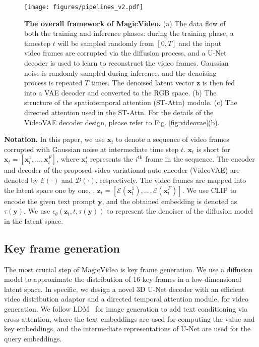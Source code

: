 \documentclass[10pt,twocolumn,letterpaper]{article}
\def\vx{{\bm{x}}}
\def\vy{{\bm{y}}}
\def\vz{{\bm{z}}}
\newcommand{\myPara}[1]{\vspace{6pt}\noindent\textbf{#1}}
\begin{document}
\begin{figure*}[t] 
\centering
\texttt{[image: figures/pipelines\_v2.pdf]}
\caption{\textbf{The overall framework of MagicVideo.} (a) The data flow of both the training and inference phases: during the training phase, a timestep $t$ will be sampled randomly from $[0, T]$ and the input video frames are corrupted via the diffusion process, and a U-Net decoder is used to learn to reconstruct the video frames. Gaussian noise is randomly sampled during inference, and the denoising process is repeated $T$ times. The denoised latent vector $\vz$ is then fed into a VAE decoder and converted to the RGB space. (b) The structure of the spatiotemporal attention (ST-Attn) module. (c) The directed attention used in the ST-Attn. For the details of the VideoVAE decoder design, please refer to Fig. \ref{fig:videovae}(b).}
\vspace{-3mm}
\label{fig:pipeline}
\end{figure*}



\myPara{Notation.} In this paper, we use $\vx_t$ to denote a sequence of video frames corrupted with Gaussian noise at intermediate time step $t$. $\vx_t$ is short for $\vx_t = [\vx_t^1, ..., \vx_t^F]$, where $\vx_t^i$ represents the $i^{\text{th}}$ frame in the sequence. The encoder and decoder of the proposed video variational auto-encoder (VideoVAE) are denoted by $\mathcal{E}(\cdot)$ and $\mathcal{D}(\cdot)$, respectively. The video frames are mapped into the latent space one by one, \ie, $\vz_t = [\mathcal{E}(\vx_t^1), ..., \mathcal{E}(\vx_t^F)]$.
We use CLIP \cite{radford2021learning} to encode the given text prompt $\vy$, and the obtained embedding is denoted as $\tau(\vy)$. We use $\epsilon_{\theta}(\vz_t, t, \tau(\vy))$ to represent the denoiser of the diffusion model in the latent space.



\subsection{Key frame generation}
The most crucial step of MagicVideo is key frame generation. We use a diffusion model to approximate the distribution of {16} key frames in a low-dimensional latent space. 
In specific, we design a novel 3D U-Net decoder with an efficient video distribution adaptor and a directed temporal attention module, for video generation. We follow   LDM~\cite{rombach_high-resolution_2022} for  image generation to add text conditioning via cross-attention, where the text embeddings are used for computing the value and key embeddings, and the intermediate representations of U-Net are used for the query embeddings.
\end{document}
